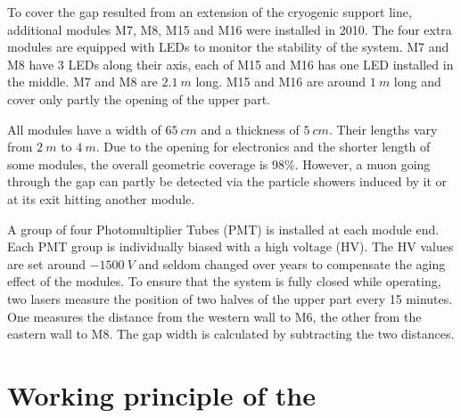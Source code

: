 To cover the gap resulted from an extension of the cryogenic support line, additional modules M7, M8, M15 and M16 were installed in 2010. The four extra modules are equipped with LEDs to monitor the stability of the system. M7 and M8 have 3 LEDs along their axis, each of M15 and M16 has one LED installed in the middle. M7 and M8 are $\SI{2.1}{m}$ long. M15 and M16 are around $\SI{1}{m}$ long and cover only partly the opening of the upper part.

All modules have a width of $\SI{65}{cm}$ and a thickness of $\SI{5}{cm}$. Their lengths vary from $\SI{2}{m}$ to $\SI{4}{m}$.
Due to the opening for electronics and the shorter length of some modules, the overall geometric coverage is 98\%. However, a muon going through the gap can partly be detected via the particle showers induced by it or at its exit hitting another module.

A group of four Photomultiplier Tubes (PMT) is installed at each module end. Each PMT group is individually biased with a high voltage (HV). The HV values are set around $\SI{-1500}{V}$ and seldom changed over years to compensate the aging effect of the modules.
To ensure that the system is fully closed while operating, two lasers measure the position of two halves of the upper part every 15 minutes. One measures the distance from the western wall to M6, the other from the eastern wall to M8. The gap width is calculated by subtracting the two distances.


\section{Working principle of the \mvs}
\label{sec:muon-working}


